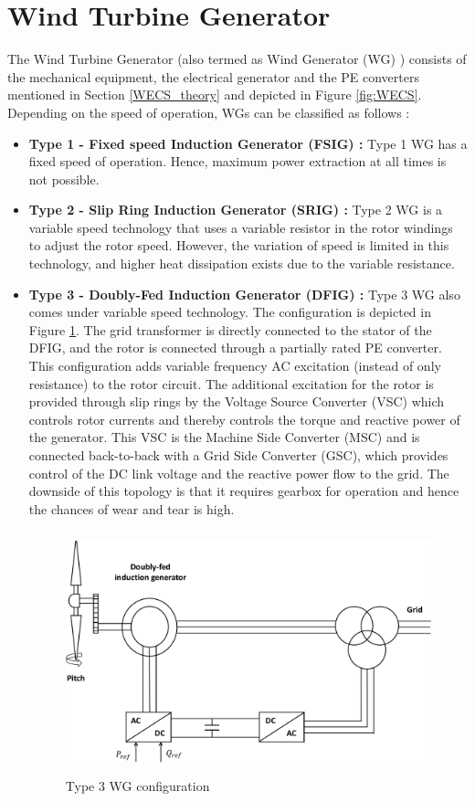 \section{Wind Turbine Generator}
The Wind Turbine Generator (also termed as Wind Generator (\gls{WG}) ) consists of the mechanical equipment, the electrical generator and the \gls{PE} converters mentioned in Section \ref{WECS_theory} and depicted in Figure \ref{fig:WECS}. Depending on the speed of operation, \gls{WG}s can be classified as follows \cite{ali_wind_2012}:

\begin{itemize}
    \item \textbf{Type 1 - Fixed speed Induction Generator (FSIG) :} Type 1 \gls{WG} has a fixed speed of operation. Hence, maximum power extraction at all times is not possible.
    \item \textbf{Type 2 - Slip Ring Induction Generator (SRIG) :} Type 2 \gls{WG} is a variable speed technology that uses a variable resistor in the rotor windings to adjust the rotor speed. However, the variation of speed is limited in this technology, and higher heat dissipation exists due to the variable resistance.
    \item \textbf{Type 3 - Doubly-Fed Induction Generator (DFIG) :} Type 3 \gls{WG} also comes under variable speed technology. The configuration is depicted in Figure \ref{fig:Type3}. The grid transformer is directly connected to the stator of the DFIG, and the rotor is connected through a partially rated \gls{PE} converter. This configuration adds variable frequency \gls{AC} excitation (instead of only resistance) to the rotor circuit. The additional excitation for the rotor is provided through slip rings by the Voltage Source Converter (\gls{VSC}) which controls rotor currents and thereby controls the torque and reactive power of the generator. This \gls{VSC} is the Machine Side Converter (\gls{MSC}) and is connected back-to-back with a Grid Side Converter (\gls{GSC}), which provides control of the \gls{DC} link voltage and the reactive power flow to the grid. The downside of this topology is that it requires gearbox for operation and hence the chances of wear and tear is high.
    
    \begin{figure}[H]
\centering
    \includegraphics[height = 7cm,width = 12cm]{Diagrams/Chapter_2/Type3WT_new.pdf}
    \caption{Type 3 WG configuration \cite{ali_wind_2012}}
    \label{fig:Type3}
\end{figure}
    

\end{itemize}
